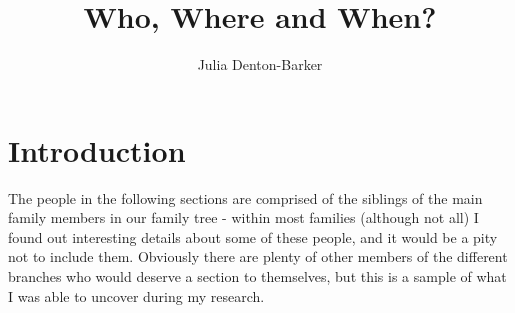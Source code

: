 \documentclass[a4paper]{article}
\title{Who, Where and When?}
\author{Julia Denton-Barker}
\begin{document}
\maketitle
\tableofcontents
\section{Introduction}

The people in the following sections are comprised of the siblings of the main family members in our family tree -  within most families (although not all) I found out interesting details about some of these people, and it would be a pity not to include them.  Obviously there are plenty of other members of the different branches who would deserve a section to themselves, but this is a sample of what I was able to uncover during my research.  










\end{document}
